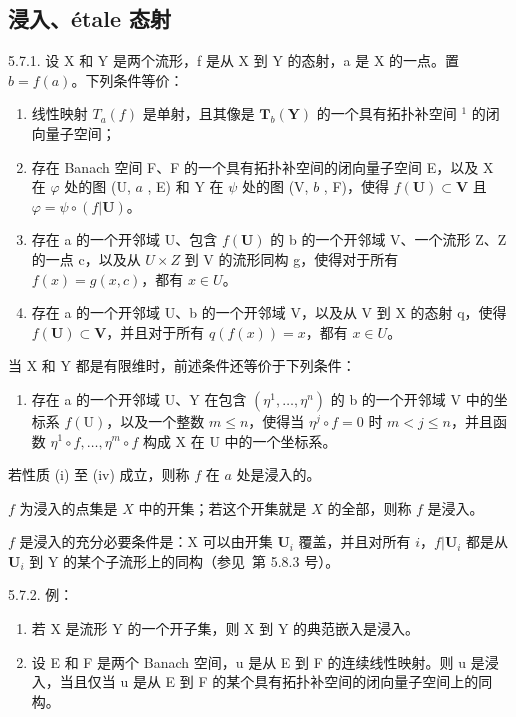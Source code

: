 \subsection{浸入、étale 态射}

5.7.1. 设 X 和 Y 是两个流形，f 是从 X 到 Y 的态射，a 是 X 的一点。置 \(b = f(a)\)。下列条件等价：

\begin{enumerate}
\def\labelenumi{(\roman{enumi})}
\item
  线性映射 \(T_{a}(f)\) 是单射，且其像是 \(\mathbf{T}_{b}(\mathbf{Y})\) 的一个具有拓扑补空间 \(^{1}\) 的闭向量子空间；
\item
  存在 Banach 空间 F、F 的一个具有拓扑补空间的闭向量子空间 E，以及 X 在 \(\varphi\) 处的图 (U, \(a\) , E) 和 Y 在 \(\psi\) 处的图 (V, \(b\) , F)，使得 \(f(\mathbf{U}) \subset \mathbf{V}\) 且 \(\varphi = \psi \circ (f|\mathbf{U})\)。
\item
  存在 a 的一个开邻域 U、包含 \(f(\mathbf{U})\) 的 b 的一个开邻域 V、一个流形 Z、Z 的一点 c，以及从 \(U \times Z\) 到 V 的流形同构 g，使得对于所有 \(f(x) = g(x, c)\)，都有 \(x \in U\)。
\item
  存在 a 的一个开邻域 U、b 的一个开邻域 V，以及从 V 到 X 的态射 q，使得 \(f(\mathbf{U}) \subset \mathbf{V}\)，并且对于所有 \(q(f(x)) = x\)，都有 \(x \in U\)。
\end{enumerate}

当 X 和 Y 都是有限维时，前述条件还等价于下列条件：

\begin{enumerate}
\def\labelenumi{(\alph{enumi})}
\setcounter{enumi}{21}
\tightlist
\item
  存在 a 的一个开邻域 U、Y 在包含 \((\eta^{1},\ldots,\eta^{n})\) 的 b 的一个开邻域 V 中的坐标系 \(f(\mathrm{U})\)，以及一个整数 \(m\leqslant n\)，使得当 \(\eta^{j}\circ f=0\) 时 \(m<j\leqslant n\)，并且函数 \(\eta^{1}\circ f,\ldots,\eta^{m}\circ f\) 构成 X 在 U 中的一个坐标系。
\end{enumerate}

若性质 (i) 至 (iv) 成立，则称 \(f\) 在 \(a\) 处是浸入的。

\(f\) 为浸入的点集是 \(X\) 中的开集；若这个开集就是 \(X\) 的全部，则称 \(f\) 是浸入。

\(f\) 是浸入的充分必要条件是：X 可以由开集 \(\mathbf{U}_{i}\) 覆盖，并且对所有 \(i\)，\(f|\mathbf{U}_{i}\) 都是从 \(\mathbf{U}_{i}\) 到 Y 的某个子流形上的同构（参见~第 5.8.3 号）。

5.7.2. 例：

\begin{enumerate}
\def\labelenumi{(\alph{enumi})}
\item
  若 X 是流形 Y 的一个开子集，则 X 到 Y 的典范嵌入是浸入。
\item
  设 E 和 F 是两个 Banach 空间，u 是从 E 到 F 的连续线性映射。则 u 是浸入，当且仅当 u 是从 E 到 F 的某个具有拓扑补空间的闭向量子空间上的同构。
\end{enumerate}

